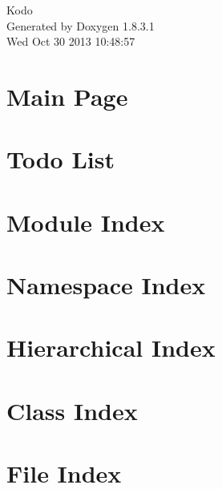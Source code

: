 \documentclass{book}
\begin{document}
\hypersetup{pageanchor=false,citecolor=blue}
\begin{titlepage}
\vspace*{7cm}
\begin{center}
{\Large Kodo }\\
\vspace*{1cm}
{\large Generated by Doxygen 1.8.3.1}\\
\vspace*{0.5cm}
{\small Wed Oct 30 2013 10:48:57}\\
\end{center}
\end{titlepage}
\clearemptydoublepage
{}
\tableofcontents
\clearemptydoublepage
{}
\hypersetup{pageanchor=true,citecolor=blue}
\chapter{Main Page}
\label{index}\hypertarget{index}{}
\chapter{Todo List}
\label{todo}
\hypertarget{todo}{}

\chapter{Module Index}

\chapter{Namespace Index}

\chapter{Hierarchical Index}

\chapter{Class Index}

\chapter{File Index}

\end{document}
